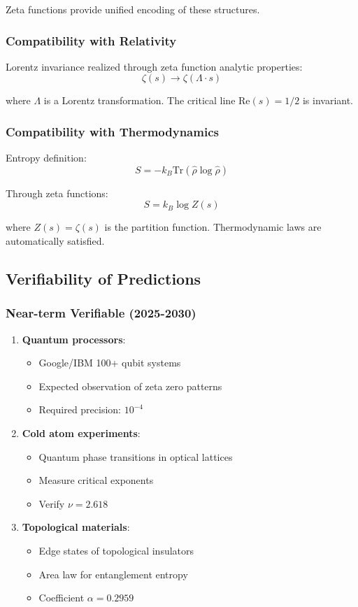 \documentclass[11pt]{article}
\theoremstyle{plain}
\theoremstyle{definition}
\theoremstyle{remark}
\begin{document}
Zeta functions provide unified encoding of these structures.

\subsubsection{Compatibility with Relativity}

Lorentz invariance realized through zeta function analytic properties:
$$\zeta(s) \to \zeta(\Lambda \cdot s)$$

where $\Lambda$ is a Lorentz transformation. The critical line $\text{Re}(s) = 1/2$ is invariant.

\subsubsection{Compatibility with Thermodynamics}

Entropy definition:
$$S = -k_B \text{Tr}(\hat{\rho} \log \hat{\rho})$$

Through zeta functions:
$$S = k_B \log Z(s)$$

where $Z(s) = \zeta(s)$ is the partition function. Thermodynamic laws are automatically satisfied.

\subsection{Verifiability of Predictions}

\subsubsection{Near-term Verifiable (2025-2030)}

\begin{enumerate}
\item \textbf{Quantum processors}:
   \begin{itemize}
   \item Google/IBM 100+ qubit systems
   \item Expected observation of zeta zero patterns
   \item Required precision: $10^{-4}$
   \end{itemize}

\item \textbf{Cold atom experiments}:
   \begin{itemize}
   \item Quantum phase transitions in optical lattices
   \item Measure critical exponents
   \item Verify $\nu = 2.618$
   \end{itemize}

\item \textbf{Topological materials}:
   \begin{itemize}
   \item Edge states of topological insulators
   \item Area law for entanglement entropy
   \item Coefficient $\alpha = 0.2959$
   \end{itemize}
\end{enumerate}
\end{document}
